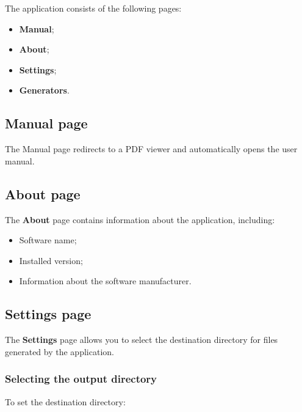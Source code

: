 ﻿\documentclass[11pt,a4paper]{article}
\begin{document}
The application consists of the following pages:

\begin{itemize}
    \item \textbf{Manual};
    \item \textbf{About};
    \item \textbf{Settings};
    \item \textbf{Generators}.
\end{itemize}

\subsection{Manual page}

The Manual page redirects to a PDF viewer and automatically opens
the user manual.

\subsection{About page}

The \textbf{About} page contains information about the application,
including:

\begin{itemize}
    \item Software name;
    \item Installed version;
    \item Information about the software manufacturer.
\end{itemize}

\subsection{Settings page}

The \textbf{Settings} page allows you to select the destination
directory for files generated by the application.

\subsubsection*{Selecting the output directory}

To set the destination directory:
\end{document}
